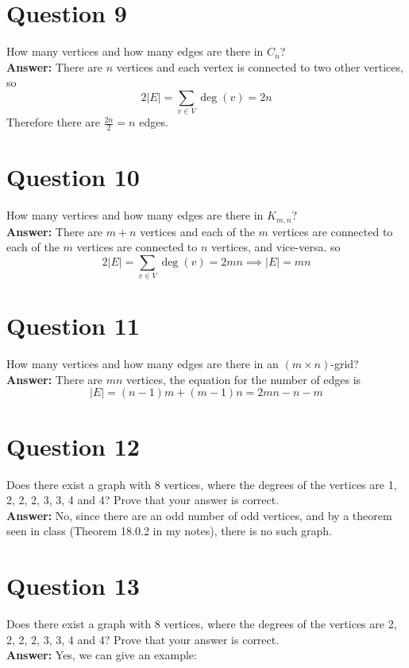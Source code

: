\documentclass[openany]{report}
\begin{document}
\section{Question 9}
How many vertices and how many edges are there in $C_n$? \\[2ex]
\textbf{Answer:} There are $n$ vertices and each vertex is connected to two other vertices, so
\[2|E| = \sum_{v \in V} \deg(v) = 2n\]
Therefore there are $\frac{2n}{2} = n$ edges.
\section{Question 10}
How many vertices and how many edges are there in $K_{m,n}$? \\[2ex]
\textbf{Answer:} There are $m + n$ vertices and each of the $m$ vertices are connected to each of the $m$ vertices are connected to $n$ vertices, and vice-versa. so 
\[2|E| = \sum_{v \in V} \deg(v) = 2mn \implies |E| = mn\]
\section{Question 11} 
How many vertices and how many edges are there in an $(m \times n)$-grid?\\[2ex]
\textbf{Answer:} There are $mn$ vertices, the equation for the number of edges is 
\[|E| = (n-1)m + (m-1)n = 2mn - n - m\]
\section{Question 12}
Does there exist a graph with 8 vertices, where the degrees of the vertices are 1, 2, 2,
2, 3, 3, 4 and 4? Prove that your answer is correct.\\[2ex]
\textbf{Answer:} No, since there are an odd number of odd vertices, and by a theorem seen in class (Theorem 18.0.2 in my notes), there is no such graph. 
\section{Question 13} Does there exist a graph with 8 vertices, where the degrees of the vertices are 2, 2, 2, 2, 3, 3, 4 and 4? Prove that your answer is correct.\\[2ex]
\textbf{Answer:} Yes, we can give an example:
\end{document}
